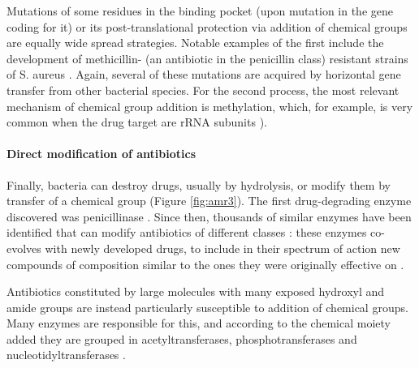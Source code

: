 Mutations of some residues in the binding pocket (upon mutation in the gene coding for it) or its post-translational protection via addition of chemical groups are equally wide spread strategies.
%
Notable examples of the first include the development of methicillin- (an antibiotic in the penicillin class) resistant strains of S. aureus \citep{Shore2011,Billal2011}. Again, several of these mutations are acquired by horizontal gene transfer from other bacterial species.
%
For the second process, the most relevant mechanism of chemical group addition is methylation, which, for example, is very common when the drug target are rRNA subunits \citep{Long2006}).


\paragraph{Direct modification of antibiotics}
Finally, bacteria can destroy drugs, usually by hydrolysis, or modify them by transfer of a chemical group (Figure \ref{fig:amr3}).
%
The first drug-degrading enzyme discovered was penicillinase \citep{Abraham1988,Lobanovska2017}. Since then, thousands of similar enzymes have been identified that can modify antibiotics of different classes \citep{Livermore2008,Nordmann2011}:
%
these enzymes co-evolves with newly developed drugs, to include in their spectrum of action new compounds of composition similar to the ones they were originally effective on \citep{Woodford2013}.

Antibiotics constituted by large molecules with many exposed hydroxyl and amide groups are instead particularly susceptible to addition of chemical groups. Many enzymes are responsible for this, and according to the chemical moiety added they are grouped in acetyltransferases, phosphotransferases and nucleotidyltransferases \citep{Wright2005}.


